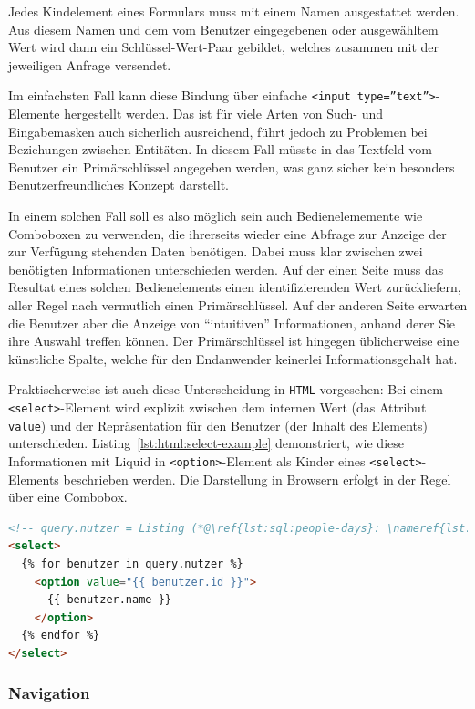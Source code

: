 Jedes Kindelement eines Formulars muss mit einem Namen ausgestattet werden. Aus diesem Namen und dem vom Benutzer eingegebenen oder ausgewähltem Wert wird dann ein Schlüssel-Wert-Paar gebildet, welches zusammen mit der jeweiligen Anfrage versendet.

Im einfachsten Fall kann diese Bindung über einfache \texttt{<input type=''text''>}-Elemente hergestellt werden. Das ist für viele Arten von Such- und Eingabemasken auch sicherlich ausreichend, führt jedoch zu Problemen bei Beziehungen zwischen Entitäten. In diesem Fall müsste in das Textfeld vom Benutzer ein Primärschlüssel angegeben werden, was ganz sicher kein besonders Benutzerfreundliches Konzept darstellt.

In einem solchen Fall soll es also möglich sein auch Bedienelememente wie Comboboxen zu verwenden, die ihrerseits wieder eine Abfrage zur Anzeige der zur Verfügung stehenden Daten benötigen. Dabei muss klar zwischen zwei benötigten Informationen unterschieden werden. Auf der einen Seite muss das Resultat eines solchen Bedienelements einen identifizierenden Wert zurückliefern, aller Regel nach vermutlich einen Primärschlüssel. Auf der anderen Seite erwarten die Benutzer aber die Anzeige von \enquote{intuitiven} Informationen, anhand derer Sie ihre Auswahl treffen können. Der Primärschlüssel ist hingegen üblicherweise eine künstliche Spalte, welche für den Endanwender keinerlei Informationsgehalt hat.

Praktischerweise ist auch diese Unterscheidung in \texttt{HTML} vorgesehen: Bei einem \texttt{<select>}-Element wird explizit zwischen dem internen Wert (das Attribut \texttt{value}) und der Repräsentation für den Benutzer (der Inhalt des Elements) unterschieden. Listing~\ref{lst:html:select-example} demonstriert, wie diese Informationen mit Liquid in \texttt{<option>}-Element als Kinder eines \texttt{<select>}-Elements beschrieben werden. Die Darstellung in Browsern erfolgt in der Regel über eine Combobox.

\begin{lstlisting}[float,language=HTML, caption=Containerelemente mit Kindern, label=lst:html:select-example]
<!-- query.nutzer = Listing (*@\ref{lst:sql:people-days}: \nameref{lst:sql:people-days}@*) -->
<select>
  {% for benutzer in query.nutzer %}
    <option value="{{ benutzer.id }}">
      {{ benutzer.name }}
    </option>
  {% endfor %}
</select>
\end{lstlisting}

\subsubsection{Navigation}
\label{sec:concept-navigation}

